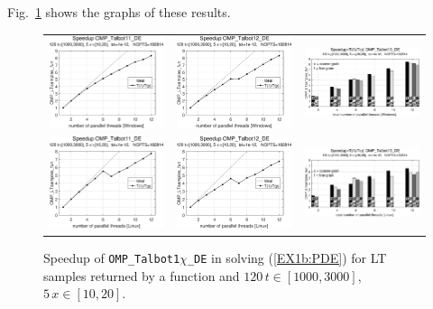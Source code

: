 \documentclass[a4paper,10pt]{report}%
\begin{document}
Fig.~\ref{PAR_EX1b_speedup_fun2} shows the graphs of these results.
\begin{figure}[htb]
\centering
\begin{tabular}{ccc} %
\includegraphics[height=0.2\textwidth]{./FIGS/EX1b/EX1b_fun2_speedup_11_Windows.eps} &
\includegraphics[height=0.2\textwidth]{./FIGS/EX1b/EX1b_fun2_speedup_12_Windows.eps} &
\includegraphics[height=0.2\textwidth,keepaspectratio=true]{./FIGS/EX1b/EX1b_fun2_speedup_13_Windows.eps} \\
\includegraphics[height=0.2\textwidth]{./FIGS/EX1b/EX1b_fun2_speedup_11_Linux.eps} &
\includegraphics[height=0.2\textwidth]{./FIGS/EX1b/EX1b_fun2_speedup_12_Linux.eps} &
\includegraphics[height=0.2\textwidth,keepaspectratio=true]{./FIGS/EX1b/EX1b_fun2_speedup_13_Linux.eps}
\end{tabular}
\caption{\small Speedup of {\tt OMP\_Talbot1$\chi$\_DE} in solving (\ref{EX1b:PDE}) for LT samples
returned by a function and $120\,t\in[1000,3000]$, $5\,x\in[10,20]$.}
\label{PAR_EX1b_speedup_fun2}
\end{figure}
\end{document}
